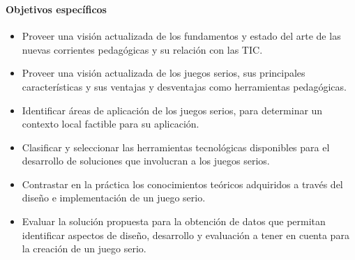 \begin{frame}
\frametitle{\pagetitle}
\framesubtitle{Objetivos específicos}

\small
\begin{itemize}[<+->]

\item Proveer una visión actualizada de los fundamentos y estado del arte de las
    nuevas corrientes pedagógicas y su relación con las TIC.

\item Proveer una visión actualizada de los juegos serios, sus principales
    características y sus ventajas y desventajas como herramientas pedagógicas.

\item Identificar áreas de aplicación de los juegos serios, para determinar un
    contexto local factible para su aplicación.

\item Clasificar y seleccionar las herramientas tecnológicas disponibles para el
    desarrollo de soluciones que involucran a los juegos serios.

\item Contrastar en la práctica los conocimientos teóricos adquiridos a través
    del diseño e implementación de un juego serio.

\item Evaluar la solución propuesta para la obtención de datos que permitan
    identificar aspectos de diseño, desarrollo y evaluación a tener en cuenta
    para la creación de un juego serio.

\end{itemize}

\end{frame}

